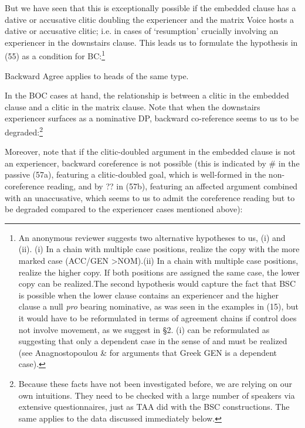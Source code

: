 \documentclass[output=paper]{langsci/langscibook}
\begin{document}
But we have seen that this is exceptionally possible if the embedded clause has a dative or accusative clitic doubling the experiencer and the matrix Voice hosts a dative or accusative clitic; i.e. in cases of ‘resumption’ crucially involving an experiencer in the downstairs clause. This leads us to formulate the hypothesis in (55) as a condition for BC:\footnote{An anonymous reviewer suggests two alternative hypotheses to us, (i) and (ii). (i)  In a chain with multiple case positions, realize the copy with the more marked case (ACC/GEN >NOM).(ii)  In a chain with multiple case positions, realize the higher copy. If both positions are assigned the same   case, the lower copy can be realized.The second hypothesis would capture the fact that BSC is possible when the lower clause contains an experiencer and the higher clause a null \textit{pro} bearing nominative, as was seen in the examples in (15), but it would have to be reformulated in terms of agreement chains if control does not involve movement, as we suggest in §2. (i) can be reformulated as suggesting that only a dependent case in the sense of \citet{Marantz1991} and \citet{Baker2015} must be realized (see Anagnostopoulou \& \citealt{Sevdali2017} for arguments that Greek GEN is a dependent case).}

\ea%
    \label{ex:alexiadou:55}
    Backward Agree applies to heads of the same type. 
\z

In the BOC cases at hand, the relationship is between a clitic in the embedded clause and a clitic in the matrix clause. Note that when the downstairs experiencer surfaces as a nominative DP, backward co-reference seems to us to be degraded:\footnote{Because these facts have not been investigated before, we are relying on our own intuitions. They need to be checked with a large number of speakers via extensive questionnaires, just as TAA did with the BSC constructions. The same applies to the data discussed immediately below.} 

    \z

Moreover, note that if the clitic-doubled argument in the embedded clause is not an experiencer, backward coreference is not possible (this is indicated by \# in the passive (57a), featuring a clitic-doubled goal, which is well-formed in the non-coreference reading, and by ?? in (57b), featuring an affected argument combined with an unaccusative, which seems to us to admit the coreference reading but to be degraded compared to the experiencer cases mentioned above):
\end{document}
